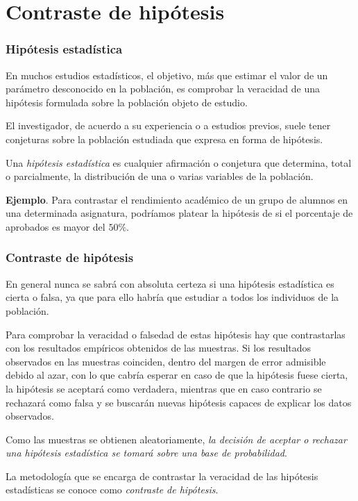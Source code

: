 
\section{Contraste de hipótesis}



\begin{frame}
\frametitle{Hipótesis estadística}
En muchos estudios estadísticos, el objetivo, más que estimar el valor de un parámetro desconocido en la población, es
comprobar la veracidad de una hipótesis formulada sobre la población objeto de estudio.

El investigador, de acuerdo a su experiencia o a estudios previos, suele tener conjeturas sobre la población estudiada
que expresa en forma de hipótesis.

\pause
\begin{definicion}
Una \emph{hipótesis estadística} es cualquier afirmación o conjetura que determina, total o parcialmente, la
distribución de una o varias variables de la población.
\end{definicion}

\pause
\textbf{Ejemplo}. Para contrastar el rendimiento académico de un grupo de alumnos en una determinada asignatura,
podríamos platear la hipótesis de si el porcentaje de aprobados es mayor del $50\%$.
\end{frame}


\begin{frame}
\frametitle{Contraste de hipótesis}
En general nunca se sabrá con absoluta certeza si una hipótesis estadística es cierta o falsa, ya que para ello habría
que estudiar a todos los individuos de la población.

\pause
Para comprobar la veracidad o falsedad de estas hipótesis hay que contrastarlas con los resultados empíricos obtenidos
de las muestras.
Si los resultados observados en las muestras coinciden, dentro del margen de error admisible debido al azar, con lo que cabría
esperar en caso de que la hipótesis fuese cierta, la hipótesis se aceptará como verdadera, mientras que en caso
contrario se rechazará como falsa y se buscarán nuevas hipótesis capaces de explicar los datos observados.

\pause
Como las muestras se obtienen aleatoriamente, \alert{\emph{la decisión de aceptar o rechazar una hipótesis estadística se
tomará sobre una base de probabilidad}}.

\pause
La metodología que se encarga de contrastar la veracidad de las hipótesis estadísticas se conoce como \emph{contraste
de hipótesis}.
\end{frame}


